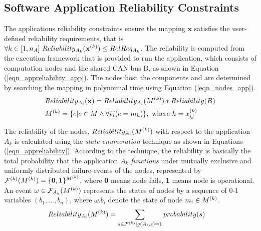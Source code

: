 \subsection{Software Application Reliability Constraints}\label{subsec_reliability_constraint}
The applications reliability constraints ensure the mapping $\textbf{x}$ satisfies the user-defined reliability requirements, that is $\forall k\in [1,n_A]\ Reliability_{A_k}(\textbf{x}^{(k)})\leq RelReq_{A_k}$. 
The reliability  is computed from the execution framework that is provided to run the application, which consists of computation nodes  and the shared CAN bus B, as shown in Equation (\ref{eqn_appreliability_app}). The nodes  host the components  and are determined by searching the mapping   in polynomial time using Equation (\ref{eqn_nodes_app}).
\begin{align}
	\label{eqn_appreliability_app}
	&Reliability_{A_i}(\x)=Reliability_{A_i}(\ssp{M})*Reliability(B)\\
	\label{eqn_nodes_app}
	&\ssp{M}=\{e|e\in M \land \forall ij (e=m_h) \},\mbox{ where } h=\ssx{k}{ij} 
\end{align}

The reliability of the nodes, $Reliability_{A_i}(\ssp{M})$ with respect to the application ${A_k}$ is calculated using the \textit{state-enumeration} technique \cite{Lucet1999ExactReliability}  as shown in Equations (\ref{eqn_appreliability}). According to the technique, the reliability is basically the total probability that the application $A_k$ \textit{functions} under mutually exclusive and uniformly distributed failure-events of the nodes, represented by $\ssp{\mathcal{F}}(\ssp{M})=\{\textbf{0},\textbf{1}\}^{\ssp{M}}$, where  \textbf{0} means node fails, \textbf{1} means  node is operational. An event $\omega\in \mathcal{F}_{A_k}(\ssp{M})$ represents the states of nodes by a sequence of 0-1 variables $(b_1,...,b_n)$, where $\omega.b_i$ denote the state of node $m_i\in \ssp{M}$. %
\begin{align}
\label{eqn_appreliability}
Reliability_{A_i}(\ssp{M})&=\sum_{s\in \ssp{\mathcal{F}}|g(A_i, s)=1}probability(s)
\end{align}

